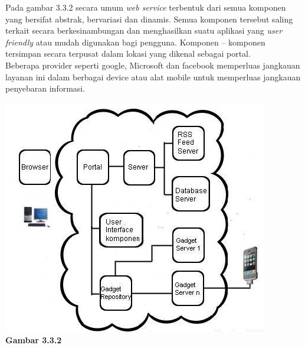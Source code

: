 \tab Pada gambar 3.3.2 secara umum \textit{web service} terbentuk dari semua komponen yang bersifat abstrak, bervariasi dan dinamis. Semua komponen tersebut saling terkait secara berkesinambungan dan menghasilkan suatu aplikasi yang \textit{user friendly} atau mudah digunakan bagi pengguna. Komponen – komponen tersimpan secara terpusat dalam lokasi yang dikenal sebagai portal.\\
\tab Beberapa provider seperti google, Microsoft dan facebook memperluas jangkauan layanan ini dalam berbagai device atau alat mobile untuk memperluas jangkauan penyebaran informasi.\\
\begin{center}
\includegraphics[scale=1]{Gambar332.jpg}\\
\textbf{Gambar 3.3.2}
\end{center}
